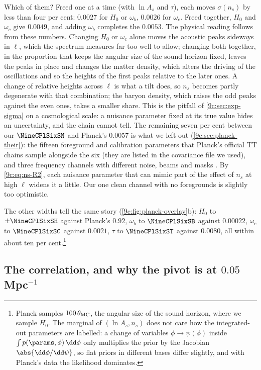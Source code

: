 Which of them? Freed one at a time (with $\ln A_s$ and $\tau$), each moves $\sigma(n_s)$ by less than four per cent:
$0.0027$ for $H_0$ or $\omega_b$, $0.0026$ for $\omega_c$. Freed together, $H_0$ and $\omega_c$ give $0.0049$, and adding
$\omega_b$ completes the $0.0053$. The physical reading follows from these numbers. Changing $H_0$ or $\omega_c$ alone
moves the acoustic peaks sideways in $\ell$, which the spectrum measures far too well to allow; changing both together,
in the proportion that keeps the angular size of the sound horizon fixed, leaves the peaks in place and changes the
matter density, which alters the driving of the oscillations and so the heights of the first peaks relative to the
later ones. A change of relative heights across $\ell$ is what a tilt does, so $n_s$ becomes partly degenerate with that
combination; the baryon density, which raises the odd peaks against the even ones, takes a smaller share.
This is the pitfall of \cref{9c:sec:exp-sigma} on a
cosmological scale: a nuisance parameter fixed at its true value hides an uncertainty, and the chain cannot tell.
The remaining seven per cent between our $\NineCPlSixSN$ and Planck's $0.0057$ is what we left out
(\cref{9c:sec:planck-their}): the fifteen foreground and calibration parameters that Planck's official TT chains
sample alongside the six (they are listed in the covariance file we used), and three frequency channels with
different noise, beams and masks \cite{Planck2018V}. By \eqref{9c:eq:ns-R2}, each nuisance parameter that can mimic part of the effect of $n_s$ at high $\ell$ widens it a little.
Our one clean channel with no foregrounds is slightly too optimistic.

The other widths tell the same story (\cref{9c:fig:planck-overlay}b): $H_0$ to $\pm\NineCPlSixSH$ against Planck's $0.92$,
$\omega_b$ to $\NineCPlSixSB$ against $0.00022$, $\omega_c$ to $\NineCPlSixSC$ against $0.0021$, $\tau$ to $\NineCPlSixST$
against $0.0080$, all within about ten per cent.\footnote{Planck samples $100\,\theta_{\rm MC}$, the angular size of the
sound horizon, where we sample $H_0$. The marginal of $(\ln A_s,n_s)$ does not care how the integrated-out parameters
are labelled: a change of variables $\phi\to\psi(\phi)$ inside $\int p(\params,\phi)\,\dd\phi$ only multiplies the prior
by the Jacobian $\abs{\dd\phi/\dd\psi}$, so flat priors in different bases differ slightly, and with Planck's data the
likelihood dominates.}

\subsection{The correlation, and why the pivot is at \texorpdfstring{$0.05\,$Mpc$^{-1}$}{0.05/Mpc}}
\label{9c:sec:planck-pivot}

